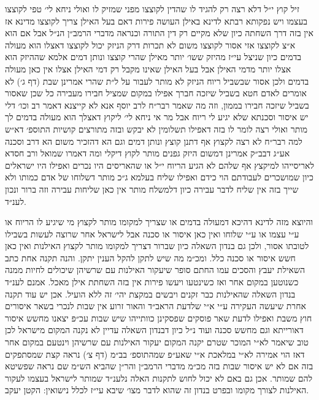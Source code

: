 \documentclass[12pt, openany]{book}
\begin{document}
\begin{multicols}{2}
זיל קוץ י״ל דלא רצה רק להגיד לו שהדין לקוצצו מפני שמזיק לו ואולי ניחא לי׳ טפי לקוצצו בעצמו ויש נפקותא רבתא לדינא באילן העושה פירות דאם בעל האילן צריך לקוצצו מדינא אז אין בזה דרך השחתה כיון שלא מקיים רק דין התורה וכנראה מדברי הרמב״ן הנ״ל אבל אם הוא א״צ לקוצצו אזי אסור לקוצצו משום לא תכרות דרק הניזק יכול לקוצצו דאצלו הוא מעולה בדמים כיון שניצל עי״ז מהיזק ששו׳ יותר מאילן שהרי קוצצו ונותן דמים אלמא שההיזק הוא אצלו יותר מדמי האילן אבל בעל האילן שאינו מקבל רק דמי האילן אצלו אין כאן מעולה בדמים ולכן אסור שבשביל ריוח הניזק לא מותר לעבור על ל״ת שהרי אמרינן שבת (דף ג׳) לא אומרים לאדם חטא בשביל שיזכה חברך אפילו במקום שמציל חבירו מעבירה כל שכן שאסור בשביל שיזכה חבירו בממון, וזה מה שאמר רבר״ח לרב יוסף אנא לא קייצנא דאמר רב וכו׳ דלי יש איסור וסכנתא שלא יגיע לי ריוח אבל מר אי ניחא לי׳ ליקוץ דאצלך הוא מעולה בדמים לך מותר ואולי רצה לומר לו בזה דאפילו תשלומין לא יבקש ובזה מתורצים קושיות התוספ׳ דא״ש למה רבר״ח לא רצה לקצוץ אף דתנן קוצץ ונותן דמים וגם הא דהזכיר משום הא דרב וסכנה אע״ג דבב״ק אמרינן דמשום היזק גפנים מותר לקוץ דיקלי ומה דאמרו שמואל ורב חסדא לאריסייהו למיקצץ אף שלהם לא הגיע הריוח י״ל או שהאריסים היו נכרים ואפילו היו ישראלים כיון שמושכרים לעבודתם הוי כידם ואפילו שליח בעלמא ג״כ מותר דשלוחו של אדם כמותו ולא שייך בזה אין שליח לדבר עבירה כיון דלמשלח מותר אין כאן שליחות עבירה וזה ברור ונכון לענ״ד.\\\vspace{0pt}

והיוצא מזה לדינא דהיכא דמעולה בדמים או שצריך למקומו מותר לקצוץ מי שיגיע לו הריוח או ע״י עצמו או ע״י שלוחו ואין כאן איסור או סכנה אבל לישראל אחר שרוצה לעשות בשבילו לטובתו אסור, ולכן גם בנדון השאלה כיון שברור דצריך למקומו מותר לקצוץ האילנות ואין כאן חשש איסור או סכנה כלל. ומכ״מ מה שיש לתקן להקל הענין יתקן. והנה תקנה אחת כתב השאילת יעבץ והסכים עמו החתם סופר שיעקור האילנות עם שרשיהן שיכולים לחיות ממנה כשנוטען במקום אחר ואז כשינטעו ויעשו פירות אין בזה השחתת אילן מאכל. אמנם לענ״ד בנדון השאלה שהאילנות כבר זקנים ויבשים במקצת יהי׳ זה ללא הועיל. אכן יש עוד תקנה אחרת שיעשה העקירה ע״י א״י שלדעת הראב״ד והאור זרוע אין שבות לנכרי בשאר איסורים חוץ משבת ואפילו לדעת שאר פוסקים שפסקינן כוותייהו שיש שבות עכ״פ יצאנו מחשש איסור דאורייתא וגם מחשש סכנה ועוד נ״ל כיון דבנדון השאלה עדיין לא נקנה המקום מישראל לכן טוב שיאמר לא״י המוכר שטרם יקנה המקום יעקור האילנות עם שרשיהן וינטעם במקום אחר דאז הוי אמירה לא״י במלאכת א״י שאע״פ שמהתוספ׳ בב״מ (דף צ׳) נראה קצת שמסתפקים בזה אם לא יש איסור שבות בזה מכ״מ מדברי הרמב״ן והר״ן שהביא הש״מ שם נראה שפשיטא להם שמותר. אכן גם באם לא יכול לחוש לתקנות האלה נלענ״ד שמותר לישראל בעצמו לעקור האילנות לצורך מקומו ובפרט בנדון זה שהוא לדבר מצו׳ שיבא עי״ז לכלל נישואין: הקטן יעקב.\\\vspace{0pt}

\end{multicols}\newpage
\end{document}
